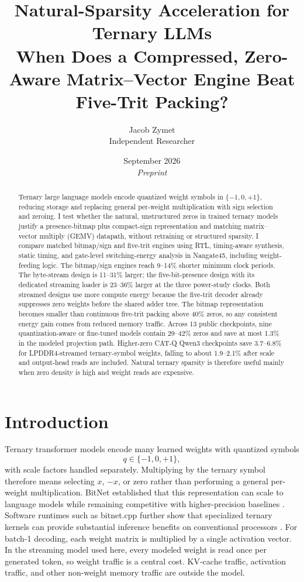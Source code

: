 \documentclass[11pt]{article}
\title{\textbf{Natural-Sparsity Acceleration for Ternary LLMs}\\When Does a Compressed, Zero-Aware Matrix--Vector Engine Beat Five-Trit Packing?}
\author{Jacob Zymet\\Independent Researcher}
\date{September 2026\\[2pt]\small\textit{Preprint}}
\begin{document}
\maketitle

\begin{abstract}
Ternary large language models encode quantized weight symbols in $\{-1,0,+1\}$, reducing storage and replacing general per-weight multiplication with sign selection and zeroing. I test whether the natural, unstructured zeros in trained ternary models justify a presence-bitmap plus compact-sign representation and matching matrix--vector multiply (GEMV) datapath, without retraining or structured sparsity. I compare matched bitmap/sign and five-trit engines using RTL, timing-aware synthesis, static timing, and gate-level switching-energy analysis in Nangate45, including weight-feeding logic. The bitmap/sign engines reach 9--14\% shorter minimum clock periods. The byte-stream design is 11--31\% larger; the five-bit-presence design with its dedicated streaming loader is 23--36\% larger at the three power-study clocks. Both streamed designs use more compute energy because the five-trit decoder already suppresses zero weights before the shared adder tree. The bitmap representation becomes smaller than continuous five-trit packing above 40\% zeros, so any consistent energy gain comes from reduced memory traffic. Across 13 public checkpoints, nine quantization-aware or fine-tuned models contain 29--42\% zeros and save at most 1.3\% in the modeled projection path. Higher-zero CAT-Q Qwen3 checkpoints save 3.7--6.8\% for LPDDR4-streamed ternary-symbol weights, falling to about 1.9--2.1\% after scale and output-head reads are included. Natural ternary sparsity is therefore useful mainly when zero density is high and weight reads are expensive.
\end{abstract}

\section{Introduction}

Ternary transformer models encode many learned weights with quantized symbols
\begin{equation}
q \in \{-1,0,+1\},
\end{equation}
with scale factors handled separately. Multiplying by the ternary symbol therefore means selecting $x$, $-x$, or zero rather than performing a general per-weight multiplication. BitNet established that this representation can scale to language models while remaining competitive with higher-precision baselines \cite{wang2025bitnet}. Software runtimes such as bitnet.cpp further show that specialized ternary kernels can provide substantial inference benefits on conventional processors \cite{wang2025bitnetcpp}. For batch-1 decoding, each weight matrix is multiplied by a single activation vector. In the streaming model used here, every modeled weight is read once per generated token, so weight traffic is a central cost. KV-cache traffic, activation traffic, and other non-weight memory traffic are outside the model.
\end{document}
